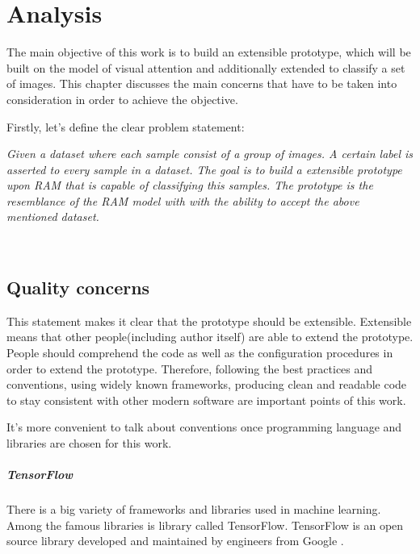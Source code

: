 \chapter{Analysis}
\label{ch:analysis}
The main objective of this work is to build an extensible prototype,
which will be built on the model of visual attention and additionally
extended to classify
a set of images. This chapter discusses the main concerns
that have to be taken into consideration in order to achieve the objective.

Firstly, let's define the clear problem statement:

\textit{
	Given a dataset where each sample consist of a group of images.
	A certain label is asserted to every sample in a dataset. The goal is
	to build a extensible prototype upon \gls{RAM} that is capable of classifying
	this samples. The prototype is the resemblance of the \gls{RAM} model with
	with the ability to accept the above mentioned dataset.
}

\\


\section{Quality concerns}
\label{sec:quality_concerns}
This statement makes it clear that the prototype should be extensible. Extensible
means that other people(including author itself) are able to extend the
prototype. People should comprehend the code as well as the configuration
procedures in order to extend the prototype. Therefore, following the best practices
and conventions, using widely known frameworks, producing clean and readable code
to stay consistent with other modern software are  important
points of this work.

It's more convenient to talk about conventions once programming language and
libraries are chosen for this work.
\paragraph{TensorFlow}

There is a big variety of frameworks and libraries used in machine learning.
Among the famous libraries is library called TensorFlow. TensorFlow is an open
source library developed and maintained by engineers from Google \cite{tensorflow2015-whitepaper}.


